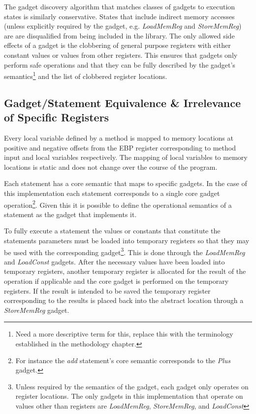 \documentclass[finalcopy,short]{srpaper}
\begin{document}
            The gadget discovery algorithm that matches classes of gadgets to
            execution states is similarly conservative. States that include
            indirect memory accesses (unless explicitly required by the gadget,
            e.g. \emph{LoadMemReg} and \emph{StoreMemReg}) are are disqualified
            from being included in the library. The only allowed side effects of
            a gadget is the clobbering of general purpose registers with either
            constant values or values from other registers. This ensures that
            gadgets only perform safe operations and that they can be fully
            described by the gadget's semantics\footnote{Need a more descriptive
            term for this, replace this with the terminology established in the
            methodology chapter.} and the list of clobbered register locations.

        \subsection{Gadget/Statement Equivalence \& Irrelevance of Specific Registers}

            Every local variable defined by a method is mapped to memory
            locations at positive and negative offsets from the EBP register
            corresponding to method input and local variables respectively. The
            mapping of local variables to memory locations is static and does
            not change over the course of the program.

            Each statement has a core semantic that maps to specific gadgets. In
            the case of this implementation each statement corresponds to a
            single core gadget operation\footnote{For instance the \emph{add}
            statement's core semantic corresponds to the \emph{Plus} gadget.}.
            Given this it is possible to define the operational semantics of a
            statement as the gadget that implements it.

            To fully execute a statement the values or constants that constitute
            the statements parameters must be loaded into temporary registers so
            that they may be used with the corresponding gadget\footnote{Unless
            required by the semantics of the gadget, each gadget only operates
            on register locations. The only gadgets in this implementation that
            operate on values other than registers are \emph{LoadMemReg},
            \emph{StoreMemReg}, and \emph{LoadConst}}.  This is done through the
            \emph{LoadMemReg} and \emph{LoadConst} gadgets.  After the necessary
            values have been loaded into temporary registers, another temporary
            register is allocated for the result of the operation if applicable
            and the core gadget is performed on the temporary registers.  If the
            result is intended to be saved the temporary register corresponding
            to the results is placed back into the abstract location through a
            \emph{StoreMemReg} gadget.
            
\end{document}
